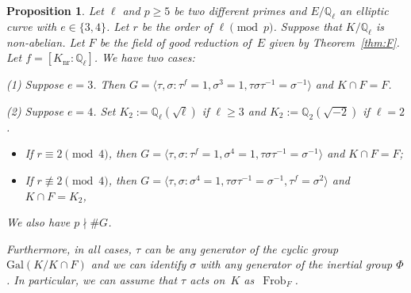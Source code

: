 \documentclass[12pt]{amsart}
\numberwithin{equation}{section}
\newtheorem{proposition}[equation]{Proposition}
\theoremstyle{definition}
\newcommand{\Q}{\mathbb{Q}}
\newcommand{\Gal}{\text{Gal}}
\newcommand{\Knr}{K_{\text{nr}}}
\DeclareMathOperator{\Frob}{Frob}
\begin{document}
\begin{proposition}\label{prop:G} 
    Let $\ell$ and $p \geq 5$ be two different primes and $E/\Q_\ell$ an elliptic curve with $e \in \{3,4\} $.
    Let $r$ be the order of $\ell \pmod p$.
     Suppose that $K/\Q_\ell$ is non-abelian. Let $F$ be the field of good reduction of~$E$ given by Theorem~\ref{thm:F}. 
     Let $f=[\Knr:\Q_\ell]$. We have two cases:

(1) Suppose $e=3$. Then  $G = \langle \tau, \sigma  : \tau ^f=1, \sigma ^3=1, \tau \sigma \tau ^{-1} = \sigma ^{-1} \rangle$ and $K\cap F= F$.

(2) Suppose $e=4$. Set $K_2 := \Q_\ell(\sqrt{\ell})$ if $\ell \geq 3$ and $K_2 := \Q_2(\sqrt{-2})$ if $\ell=2$.
	\begin{itemize}
        \item[(a)] If $r\equiv 2 \pmod 4$, then
        $G = \langle \tau, \sigma  : \tau ^f=1, \sigma ^4=1, \tau \sigma \tau ^{-1} = \sigma ^{-1} \rangle$ and $K\cap F= F$;
        \item[(b)] If $r\not\equiv 2 \pmod 4$, then $G  =\langle \tau , \sigma  : \sigma ^4=1, \tau \sigma \tau ^{-1} = \sigma ^{-1}, \tau^f=\sigma^2 \rangle$ and $K\cap F= K_2$,
    \end{itemize}
We also have $p\nmid \# G$.

Furthermore, in all cases, $\tau$ can be any generator of the cyclic group $\Gal(K/K\cap F)$ and we can identify $\sigma$ with any generator of the inertial group $\Phi$. In particular, we can assume that $\tau$ acts on~$K$ as~$\Frob_F$.
\end{proposition}
\end{document}

